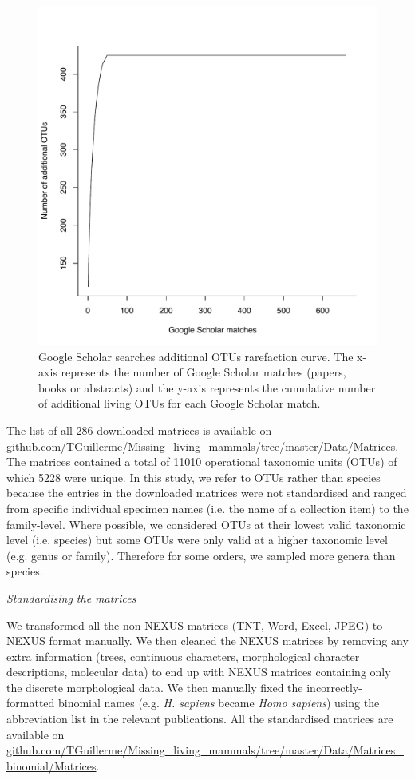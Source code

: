 \documentclass[12pt,letterpaper]{article}
\renewcommand{\subsection}[1]{%
\bigskip
\begin{center}
\begin{large}
\normalfont\itshape #1
\end{large}
\end{center}}
\begin{document}
\begin{figure}[!htbp]
\centering
    \includegraphics[width=1\textwidth]{Supp_figure_google_searches.pdf}
\caption{Google Scholar searches additional OTUs rarefaction curve. The x-axis represents the number of Google Scholar matches (papers, books or abstracts) and the y-axis represents the cumulative number of additional living OTUs for each Google Scholar match.}
\label{Supp_figure_google_searches}
\end{figure}

The list of all 286 downloaded matrices is available on \url{github.com/TGuillerme/Missing_living_mammals/tree/master/Data/Matrices}.
The matrices contained a total of 11010 operational taxonomic units (OTUs) of which 5228 were unique.
In this study, we refer to OTUs rather than species because the entries in the downloaded matrices were not standardised and ranged from specific individual specimen names (i.e. the name of a collection item) to the family-level.
Where possible, we considered OTUs at their lowest valid taxonomic level (i.e. species) but some OTUs were only valid at a higher taxonomic level (e.g. genus or family).
Therefore for some orders, we sampled more genera than species.

\subsection{Standardising the matrices}
We transformed all the non-NEXUS matrices (TNT, Word, Excel, JPEG) to NEXUS format manually.
We then cleaned the NEXUS matrices by removing any extra information (trees, continuous characters, morphological character descriptions, molecular data) to end up with NEXUS matrices containing only the discrete morphological data.
We then manually fixed the incorrectly-formatted binomial names (e.g. \textit{H. sapiens} became \textit{Homo sapiens}) using the abbreviation list in the relevant publications. 
All the standardised matrices are available on \url{github.com/TGuillerme/Missing_living_mammals/tree/master/Data/Matrices_binomial/Matrices}.
\end{document}
